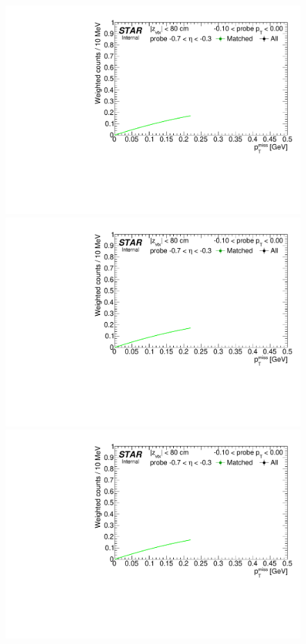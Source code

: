 \begin{figure}[h!]
{}~~~~
\parbox{0.24\textwidth}{ 
  \centering
  \includegraphics[width=\linewidth,page=6]{graphics/correctionsToEff/TOF_tagAndProbe/Fitting_effVsPt_data_ETABINS_D.CPT2.pdf}\\
  \includegraphics[width=\linewidth,page=8]{graphics/correctionsToEff/TOF_tagAndProbe/Fitting_effVsPt_data_ETABINS_D.CPT2.pdf}\\
  \includegraphics[width=\linewidth,page=10]{graphics/correctionsToEff/TOF_tagAndProbe/Fitting_effVsPt_data_ETABINS_D.CPT2.pdf}\\[84pt]

}
\end{figure}
